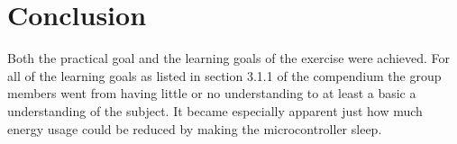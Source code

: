 \chapter{Conclusion}
Both the practical goal and the learning goals of the exercise were achieved. For all of the learning goals as listed in section 3.1.1 of the compendium \cite{compendium} the group members went from having little or no understanding to at least a basic a understanding of the subject. It became especially apparent just how much energy usage could be reduced by making the microcontroller sleep.
